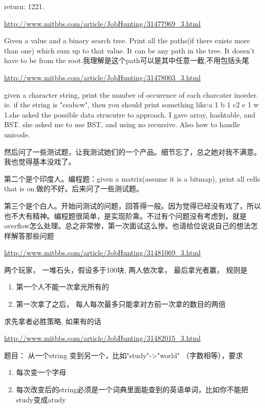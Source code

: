\documentclass[12pt]{book}
\begin{document}
return: 1221.

\url{http://www.mitbbs.com/article/JobHunting/31477969_3.html}

Given a value and a binary search tree. Print all the paths(if there exists more than one) which sum up to that value. It can be any path in the tree. It doesn't have to be from the root.我理解是这个path可以是其中任意一截,不用包括头尾

\url{http://www.mitbbs.com/article/JobHunting/31478003_3.html}

given a character string, print the number of occurence of each
charcater inorder. ie. if the string is "ceabcw", then you should
print something like:a 1 b 1 c2 e 1 w 1.she asked the possible data
strucutre to approach. I gave array, hashtable, and BST. she asked me
to use BST, and using no recursive. Also how to handle unicode.

然后问了一些测试题，让我测试她们的一个产品。细节忘了，总之她对我不满意。我也觉得基本没戏了。

第二个是个印度人。编程题：given a matrix(assume it is a bitmap), print all cells that is on.做的不好。后来问了一些测试题。

第三个是个白人。开始问测试的问题，回答得一般。因为觉得已经没有戏了，所以也不大有精神。编程题很简单，是实现阶乘。不过有个问题没有考虑到，就是overflow怎么处理。总之非常惨，第一次面试这么惨。也请给位说说自己的想法怎样解答那些问题

\url{http://www.mitbbs.com/article/JobHunting/31481069_3.html}

两个玩家， 一堆石头，假设多于100块, 两人依次拿， 最后拿光者赢， 规则是

\begin{enumerate}
\item 第一个人不能一次拿光所有的

\item 第一次拿了之后， 每人每次最多只能拿对方前一次拿的数目的两倍
\end{enumerate}

求先拿者必胜策略, 如果有的话

\url{http://www.mitbbs.com/article/JobHunting/31482015_3.html}

题目：
从一个string 变到另一个，比如"study"->"world" （字数相等），要求

\begin{enumerate}
\item 每次变一个字母

\item 每次改变后的string必须是一个词典里面能查到的英语单词，比如你不能把study变成atudy
\end{enumerate}
\end{document}
